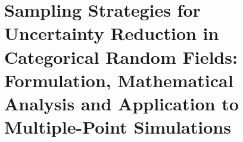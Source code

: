 \chapter{{Sampling} Strategies for Uncertainty Reduction in Categorical Random Fields: Formulation, Mathematical Analysis and Application to Multiple-Point Simulations} 
\label{chapter_PI}









